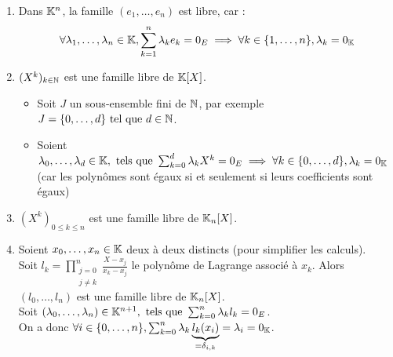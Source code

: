 \documentclass[12pt, a4paper]{report}
\begin{document}
\begin{example}
    \begin{enumerate}
        \item Dans $\mathbb{K}^n$, la famille $(e_1,\dots,e_n)$ est libre, car :
        $$
            \forall \lambda_1,\dots,\lambda_n \in \mathbb{K}, \sum_{k=1}^n \lambda_k e_k = 0_E \implies \forall k \in \{1,\dots,n\}, \lambda_k = 0_{\mathbb{K}}
        $$
        \item $(X^k)_{k \in \mathbb{N}}$ est une famille libre de $\mathbb{K}[X]$.
        \begin{itemize}
            \item Soit $J$ un sous-ensemble fini de $\mathbb{N}$, par exemple $J = \{0,\dots,d\} \text{ tel que } d \in \mathbb{N}$.
            \item Soient $\lambda_0,\dots,\lambda_d \in \mathbb{K}, \text{ tels que } \sum_{k=0}^d \lambda_k X^k = 0_E \implies \forall k \in \{0,\dots,d\}, \lambda_k = 0_{\mathbb{K}}$ (car les polynômes sont égaux si et seulement si leurs coefficients sont égaux)
        \end{itemize}
        \item $(X^k)_{0 \le k \le n}$ est une famille libre de $\mathbb{K}_n[X]$.
        \item Soient $x_0,\dots,x_n \in \mathbb{K}$ deux à deux distincts (pour simplifier les calculs).\\Soit $l_k = \prod_{\substack{j=0\\j\neq k}}^n \frac{X-x_j}{x_k - x_j}$ le polynôme de Lagrange associé à $x_k$. Alors $(l_0,\dots,l_n)$ est une famille libre de $\mathbb{K}_n[X]$.\\
        Soit $(\lambda_0,\dots,\lambda_n) \in \mathbb{K}^{n+1}, \text{ tels que } \sum_{k=0}^n \lambda_k l_k = 0_E$.\\
        On a donc $\forall i \in \{0,\dots,n\}, \sum_{k=0}^n \lambda_k \underbrace{l_k(x_i)}_{= \delta_{i,k}} = \lambda_i = 0_{\mathbb{K}}$.
    \end{enumerate}
    \label{ex:lagrange_libre}
\end{example}
\end{document}

